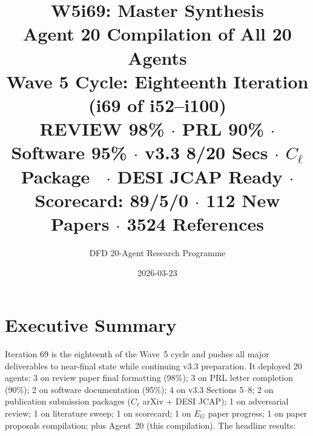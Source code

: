 \documentclass[11pt,a4paper]{article}
\title{\Huge W5i69: Master Synthesis\\[12pt]
\Large Agent 20 Compilation of All 20 Agents\\[6pt]
\large Wave 5 Cycle: Eighteenth Iteration (i69 of i52--i100)\\[6pt]
\normalsize \textbf{REVIEW 98\%} $\cdot$ PRL 90\% $\cdot$ Software 95\% $\cdot$ v3.3 8/20 Secs $\cdot$ $C_\ell$ Package \GREEN\ $\cdot$ DESI JCAP Ready $\cdot$ Scorecard: 89/5/0 $\cdot$ 112 New Papers $\cdot$ 3524 References}
\author{DFD 20-Agent Research Programme}
\date{2026-03-23}
\begin{document}
\maketitle


\section{Executive Summary}

Iteration 69 is the eighteenth of the Wave~5 cycle and pushes all major deliverables to near-final state while continuing v3.3 preparation. It deployed 20 agents: 3 on review paper final formatting (98\%); 3 on PRL letter completion (90\%); 2 on software documentation (95\%); 4 on v3.3 Sections 5--8; 2 on publication submission packages ($C_\ell$ arXiv + DESI JCAP); 1 on adversarial review; 1 on literature sweep; 1 on scorecard; 1 on $E_G$ paper progress; 1 on paper proposals compilation; plus Agent~20 (this compilation). The headline results:
\end{document}

